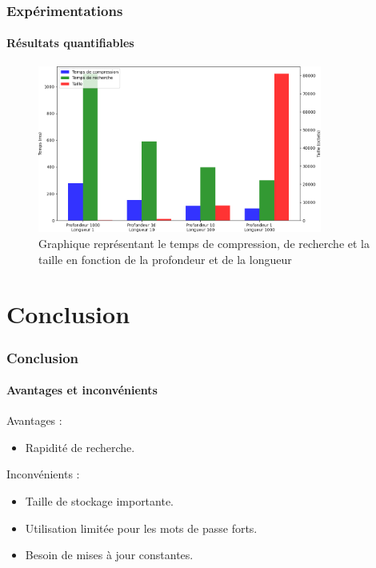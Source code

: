 \documentclass{beamer}
\begin{document}
\begin{frame}
\frametitle{Expérimentations}
\framesubtitle {Résultats quantifiables}
\begin{figure}[H]
\centering
\includegraphics[height=5.5cm]{img/graphique.png}
\caption{Graphique représentant le temps de compression, de recherche et la taille en fonction de la profondeur et de la longueur}
\end{figure}
\end{frame}

\section{Conclusion}
\begin{frame}
\frametitle{Conclusion}
\framesubtitle {Avantages et inconvénients}
Avantages :
\begin{itemize}
    \item Rapidité de recherche.
\end{itemize}
Inconvénients :
\begin{itemize}
    \item Taille de stockage importante.
    \item Utilisation limitée pour les mots de passe forts.
    \item Besoin de mises à jour constantes.
\end{itemize}
\end{frame}
\end{document}
